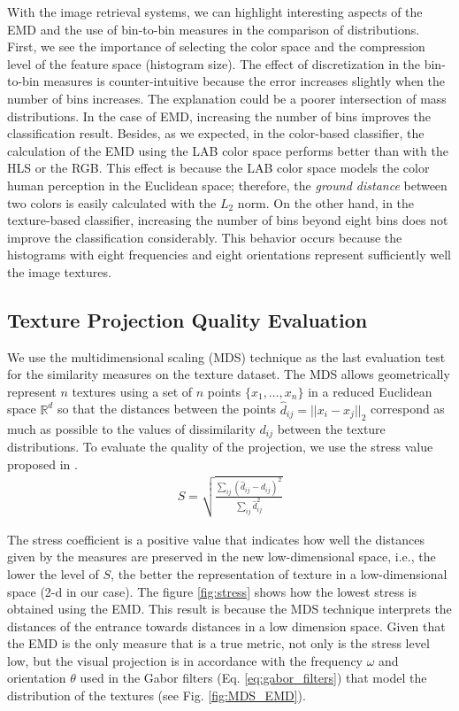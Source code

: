 With the image retrieval systems, we can highlight interesting aspects of the EMD and the use of bin-to-bin measures in the comparison of distributions. First, we see the importance of selecting the color space and the compression level of the feature space (histogram size). The effect of discretization in the bin-to-bin measures is counter-intuitive because the error increases slightly when the number of bins increases. The explanation could be a poorer intersection of mass distributions. In the case of EMD, increasing the number of bins improves the classification result. Besides, as we expected, in the color-based classifier, the calculation of the EMD using the LAB color space performs better than with the HLS or the RGB. This effect is because the LAB color space models the color human perception in the Euclidean space; therefore, the \textit{ground distance} between two colors is easily calculated with the $L_2$ norm. On the other hand, in the texture-based classifier, increasing the number of bins beyond eight bins does not improve the classification considerably. This behavior occurs because the histograms with eight frequencies and eight orientations represent sufficiently well the image textures.

\subsection{Texture Projection Quality Evaluation} \label{subsec:mds}

We use the multidimensional scaling (MDS) technique \citep{Kruskal:Psycho:1964} as the last evaluation test for the similarity measures on the texture dataset. The MDS allows geometrically represent $n$ textures using a set of $n$ points $\{x_1, \ldots, x_n\}$ in a reduced Euclidean space $\mathbb{R}^{d}$ so that the distances between the points $\hat{d}_{ij} = ||x_i-x_j||_2$ correspond as much as possible to the values of dissimilarity $d_{ij}$ between the texture distributions. To evaluate the quality of the projection, we use the stress value proposed in \citep{Kruskal:Psycho:1964}.
\begin{eqnarray}
S= \sqrt{\frac{\sum_{ij}(\hat{d}_{ij}-d_{ij})^2}{\sum_{ij}\hat{d}_{ij}^2}}
\label{eq:stress}
\end{eqnarray}

The stress coefficient is a positive value that indicates how well the distances given by the measures are preserved in the new low-dimensional space, i.e., the lower the level of $S$, the better the representation of texture in a low-dimensional space (2-d in our case). The figure \ref{fig:stress} shows how the lowest stress is obtained using the EMD. This result is because the MDS technique interprets the distances of the entrance towards distances in a low dimension space. Given that the EMD is the only measure that is a true metric, not only is the stress level low, but the visual projection is in accordance with the frequency $\omega$ and orientation $\theta$ used in the Gabor filters (Eq. \eqref{eq:gabor_filters}) that model the distribution of the textures (see Fig. \ref{fig:MDS_EMD}). %

